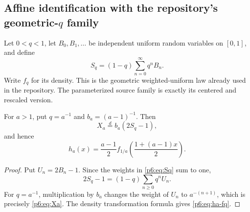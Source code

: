 \documentclass[11pt,oneside]{article}
\numberwithin{equation}{section}
\theoremstyle{definition}
\theoremstyle{remark}
\begin{document}
\subsection{Affine identification with the repository's geometric-\texorpdfstring{$q$}{q} family}

Let $0<q<1$, let $B_0,B_1,\dots$ be independent uniform random variables on
$[0,1]$, and define
\begin{equation}\label{p6:eq:Sq}
 S_q=(1-q)\sum_{n=0}^{\infty}q^nB_n.
\end{equation}
Write $f_q$ for its density.  This is the geometric weighted-uniform law already
used in the repository.  The parameterized source family is exactly its centered
and rescaled version.

\begin{proposition}\label{p6:prop:q-crosswalk}
For $a>1$, put $q=a^{-1}$ and $b_a=(a-1)^{-1}$.  Then
\begin{equation}\label{p6:eq:Xa-Sq}
 X_a\overset d=b_a(2S_q-1),
\end{equation}
and hence
\begin{equation}\label{p6:eq:ha-fq}
 h_a(x)=\frac{a-1}{2}
 f_{1/a}\!\left(\frac{1+(a-1)x}{2}\right).
\end{equation}
\end{proposition}

\begin{proof}
Put $U_n=2B_n-1$.  Since the weights in \eqref{p6:eq:Sq} sum to one,
\[
 2S_q-1=(1-q)\sum_{n\ge0}q^nU_n.
\]
For $q=a^{-1}$, multiplication by $b_a$ changes the weight of $U_n$ to
$a^{-(n+1)}$, which is precisely \eqref{p6:eq:Xa}.  The density transformation
formula gives \eqref{p6:eq:ha-fq}.
\end{proof}
\end{document}
